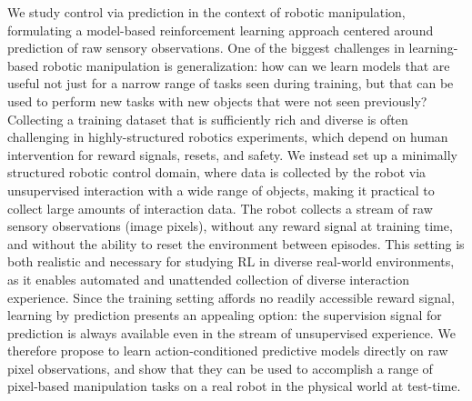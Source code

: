We study control via prediction in the context of robotic manipulation, formulating a model-based reinforcement learning approach centered around prediction of raw sensory observations. One of the biggest challenges in learning-based robotic manipulation is generalization: how can we learn models that are useful not just for a narrow range of tasks seen during training, but that can be used to perform new tasks with new objects that were not seen previously?
Collecting a training dataset that is sufficiently rich and diverse is often challenging in highly-structured robotics experiments, which depend on human intervention for reward signals, resets, and safety. We instead set up a minimally structured robotic control domain, where data is collected by the robot via unsupervised interaction with a wide range of objects, making it practical to collect large amounts of interaction data. The robot collects a stream of raw sensory observations (image pixels), without any reward signal at training time, and without the ability to reset the environment between episodes. This setting is both realistic and necessary for studying RL in diverse real-world environments, as it enables automated and unattended collection of diverse interaction experience. Since the training setting affords no readily accessible reward signal, learning by prediction presents an appealing option: the supervision signal for prediction is always available even in the stream of unsupervised experience.
We therefore propose to learn action-conditioned predictive models directly on raw pixel observations, and show that they can be used to accomplish a range of pixel-based manipulation tasks on a real robot in the physical world at test-time. 

